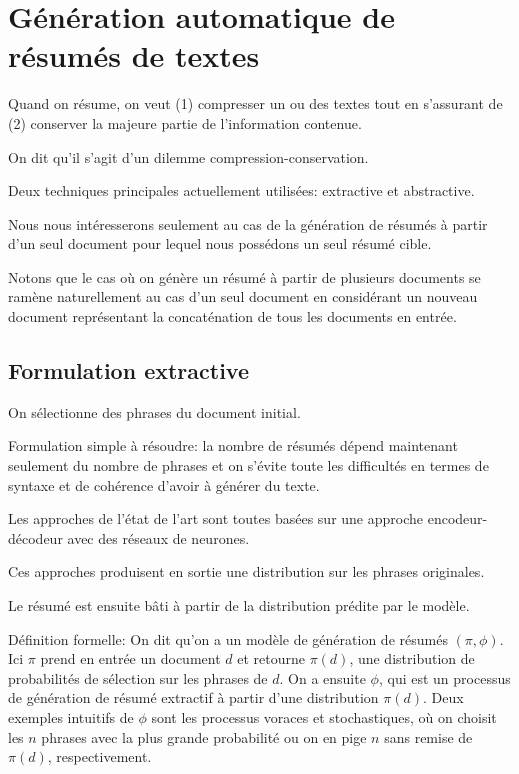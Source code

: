 \chapter{Génération automatique de résumés de textes}     %
\label{chap:generation_resumes}                           %

Quand on résume, on veut (1) compresser un ou des textes tout en
s'assurant de (2) conserver la majeure partie de l'information contenue.

On dit qu'il s'agit d'un dilemme compression-conservation.

Deux techniques principales actuellement utilisées: extractive et abstractive.

Nous nous intéresserons seulement au cas de la génération de résumés à partir
d'un seul document pour lequel nous possédons un seul résumé cible.

Notons que le cas où on génère un résumé à partir de plusieurs documents se ramène
naturellement au cas d'un seul document en considérant un nouveau document
représentant la concaténation de tous les documents en entrée.

\section{Formulation extractive}

On sélectionne des phrases du document initial.

Formulation simple à résoudre: la nombre de résumés dépend maintenant seulement du nombre
de phrases et on s'évite toute les difficultés en termes de syntaxe et de cohérence
d'avoir à générer du texte.

Les approches de l'état de l'art sont toutes basées sur une approche
encodeur-décodeur avec des réseaux de neurones.

Ces approches produisent en sortie une distribution sur les phrases
originales.

Le résumé est ensuite bâti à partir de la distribution prédite par le modèle.

Définition formelle: On dit qu'on a un modèle de génération de résumés
$(\pi, \phi)$.
Ici $\pi$ prend en entrée un document $d$ et retourne
$\pi(d)$, une distribution de probabilités de sélection sur les phrases
de $d$.
On a ensuite $\phi$, qui est un processus de génération de résumé
extractif à partir d'une distribution $\pi(d)$.
Deux exemples intuitifs de $\phi$ sont les processus voraces et stochastiques,
où on choisit les $n$ phrases avec la plus grande probabilité ou on en pige
$n$ sans remise de $\pi(d)$, respectivement.

